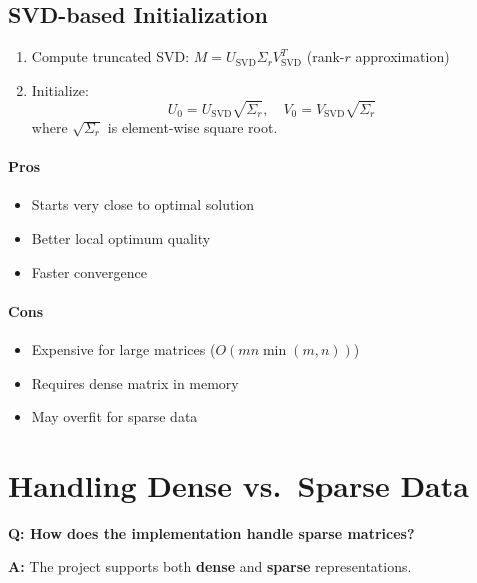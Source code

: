 \documentclass[11pt,oneside]{article}
\newcommand{\defn}[1]{\textbf{#1}}
\newcommand{\question}[1]{\textbf{Q: #1}}
\newcommand{\answer}{\textbf{A: }}
\begin{document}
\subsection*{SVD-based Initialization}

\begin{enumerate}
    \item Compute truncated SVD: $M = U_{\text{SVD}}\Sigma_r V_{\text{SVD}}^T$ (rank-$r$ approximation)
    \item Initialize:
    \begin{equation}
        U_0 = U_{\text{SVD}} \sqrt{\Sigma_r}, \quad V_0 = V_{\text{SVD}} \sqrt{\Sigma_r}
    \end{equation}
    where $\sqrt{\Sigma_r}$ is element-wise square root.
\end{enumerate}

\paragraph{Pros}
\begin{itemize}
    \item Starts very close to optimal solution
    \item Better local optimum quality
    \item Faster convergence
\end{itemize}

\paragraph{Cons}
\begin{itemize}
    \item Expensive for large matrices ($O(mn \min(m,n))$)
    \item Requires dense matrix in memory
    \item May overfit for sparse data
\end{itemize}

\section{Handling Dense vs.\ Sparse Data}\label{sec:sparse}

\question{How does the implementation handle sparse matrices?}

\answer The project supports both \defn{dense} and \defn{sparse} representations.
\end{document}
